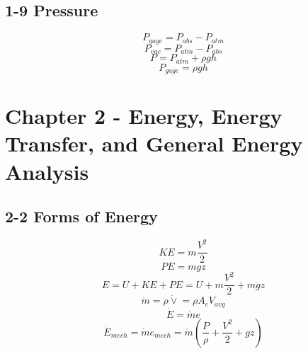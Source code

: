 \documentclass[10pt,landscape]{article}
\begin{document}
\begin{multicols}{3}
\subsection{1-9 Pressure}
\begin{equation}
    P_{gage}=P_{abs}-P_{atm}
\end{equation}
\begin{equation}
    P_{vac}=P_{atm}-P_{abs}
\end{equation}
\begin{equation}
    P=P_{atm}+\rho gh
\end{equation}
\begin{equation}
    P_{gage}=\rho gh
\end{equation}

\section{Chapter 2 - Energy, Energy Transfer, and General Energy Analysis}
\subsection{2-2 Forms of Energy}
\begin{equation}
    KE=m\frac{V^2}{2}
\end{equation}
\begin{equation}
    PE=mgz
\end{equation}
\begin{equation}
    E=U+KE+PE=U+m\frac{V^2}{2}+mgz
\end{equation}
\begin{equation}
    \dot{m}=\rho\dot{\vee}=\rho A_cV_{avg}
\end{equation}
\begin{equation}
    \dot{E}=\dot{m}e
\end{equation}
\begin{equation}
    \dot{E}_{mech}=\dot{m}e_{mech}=\dot{m}(\frac{P}{\rho}+\frac{V^2}{2}+gz)
\end{equation}

\end{multicols}
\end{document}
